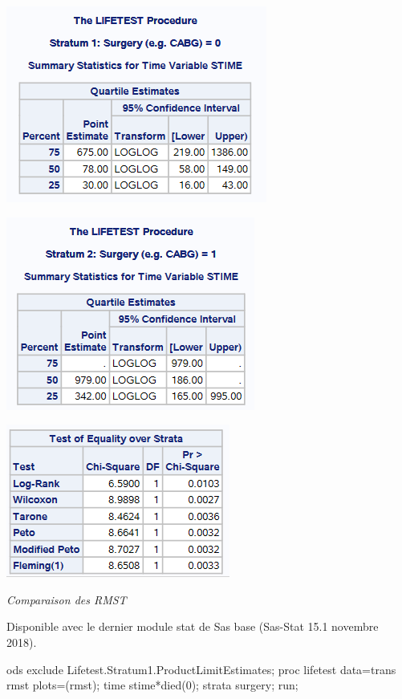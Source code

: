 \documentclass[
  12pt,
  letterpaper,
  DIV=11,
  numbers=noendperiod,
  onepage,
  openany]{scrreprt}
\newenvironment{Shaded}{\begin{snugshade}}{\end{snugshade}}
\newcommand{\DecValTok}[1]{\textcolor[rgb]{0.86,0.86,0.80}{#1}}
\newcommand{\FunctionTok}[1]{\textcolor[rgb]{0.94,0.94,0.56}{#1}}
\newcommand{\NormalTok}[1]{\textcolor[rgb]{0.80,0.80,0.80}{#1}}
\newcommand{\OtherTok}[1]{\textcolor[rgb]{0.94,0.94,0.56}{#1}}
\newcommand{\SpecialCharTok}[1]{\textcolor[rgb]{0.86,0.64,0.64}{#1}}
\begin{document}
\includegraphics{sas/3b.PNG}

\includegraphics{sas/3c.PNG}

\includegraphics{sas/3d.PNG}

\emph{Comparaison des RMST}

Disponible avec le dernier module stat de Sas base (Sas-Stat 15.1
novembre 2018).

\begin{Shaded}
\begin{Highlighting}[]
\NormalTok{ods exclude Lifetest.Stratum1.ProductLimitEstimates;}
\NormalTok{proc lifetest data}\OtherTok{=}\NormalTok{trans rmst plots}\OtherTok{=}\NormalTok{(rmst);}
\NormalTok{time stime}\SpecialCharTok{*}\FunctionTok{died}\NormalTok{(}\DecValTok{0}\NormalTok{);}
\NormalTok{strata surgery; run;}
\end{Highlighting}
\end{Shaded}
\end{document}
